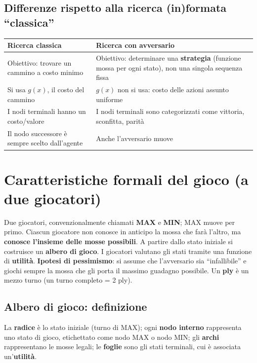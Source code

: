 \documentclass[11pt,a4paper]{report}
\begin{document}
\subsection*{Differenze rispetto alla ricerca (in)formata ``classica''}

\begin{center}
\begin{tabular}{@{}p{5.2cm}p{5.2cm}@{}}
\toprule
\textbf{Ricerca classica} & \textbf{Ricerca con avversario} \\
\midrule
Obiettivo: trovare un cammino a costo minimo & Obiettivo: determinare una \textbf{strategia} (funzione mossa per ogni stato), non una singola sequenza fissa \\
Si usa $g(x)$, il costo del cammino & $g(x)$ non si usa: costo delle azioni assunto uniforme \\
I nodi terminali hanno un costo/valore & I nodi terminali sono categorizzati come vittoria, sconfitta, parità \\
Il nodo successore è sempre scelto dall'agente & Anche l'avversario muove \\
\bottomrule
\end{tabular}
\end{center}

\section{Caratteristiche formali del gioco (a due giocatori)}

Due giocatori, convenzionalmente chiamati \textbf{MAX} e \textbf{MIN}; MAX muove per primo. Ciascun giocatore non conosce in anticipo la mossa che farà l'altro, ma \textbf{conosce l'insieme delle mosse possibili}. A partire dallo stato iniziale si costruisce un \textbf{albero di gioco}. I giocatori valutano gli stati tramite una funzione di \textbf{utilità}. \textbf{Ipotesi di pessimismo}: si assume che l'avversario sia ``infallibile'' e giochi sempre la mossa che gli porta il massimo guadagno possibile. Un \textbf{ply} è un mezzo turno (un turno completo = 2 ply).

\subsection*{Albero di gioco: definizione}

La \textbf{radice} è lo stato iniziale (turno di MAX); ogni \textbf{nodo interno} rappresenta uno stato di gioco, etichettato come nodo MAX o nodo MIN; gli \textbf{archi} rappresentano le mosse legali; le \textbf{foglie} sono gli stati terminali, cui è associata un'\textbf{utilità}.
\end{document}
